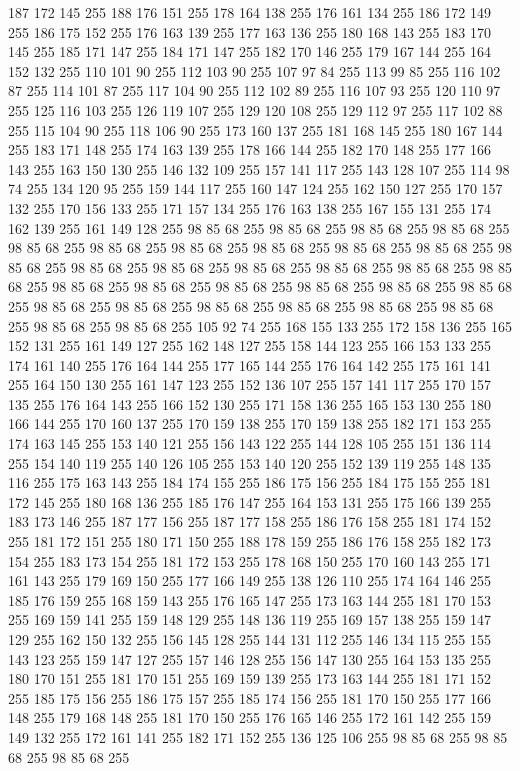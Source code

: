 187 172 145 255 188 176 151 255 178 164 138 255 176 161 134 255 186 172 149 255 186 175 152 255 176 163 139 255 177 163 136 255 180 168 143 255 183 170 145 255 185 171 147 255 184 171 147 255 182 170 146 255 179 167 144 255 164 152 132 255 110 101 90 255 112 103 90 255 107 97 84 255 113 99 85 255 116 102 87 255 114 101 87 255 117 104 90 255 112 102 89 255 116 107 93 255 120 110 97 255 125 116 103 255 126 119 107 255 129 120 108 255 129 112 97 255 117 102 88 255 115 104 90 255 118 106 90 255 173 160 137 255 181 168 145 255 180 167 144 255 183 171 148 255 174 163 139 255 178 166 144 255 182 170 148 255 177 166 143 255 163 150 130 255 146 132 109 255 157 141 117 255 143 128 107 255 114 98 74 255 134 120 95 255 159 144 117 255 160 147 124 255 162 150 127 255 170 157 132 255 170 156 133 255 171 157 134 255 176 163 138 255 167 155 131 255 174 162 139 255 161 149 128 255 98 85 68 255 98 85 68 255 98 85 68 255 98 85 68 255 98 85 68 255 98 85 68 255 98 85 68 255 98 85 68 255
98 85 68 255 98 85 68 255 98 85 68 255 98 85 68 255 98 85 68 255 98 85 68 255 98 85 68 255 98 85 68 255 98 85 68 255 98 85 68 255 98 85 68 255 98 85 68 255 98 85 68 255 98 85 68 255 98 85 68 255 98 85 68 255 98 85 68 255 98 85 68 255 98 85 68 255 98 85 68 255 98 85 68 255 98 85 68 255 98 85 68 255 105 92 74 255 168 155 133 255 172 158 136 255 165 152 131 255 161 149 127 255 162 148 127 255 158 144 123 255 166 153 133 255 174 161 140 255 176 164 144 255 177 165 144 255 176 164 142 255 175 161 141 255 164 150 130 255 161 147 123 255 152 136 107 255 157 141 117 255 170 157 135 255 176 164 143 255 166 152 130 255 171 158 136 255 165 153 130 255 180 166 144 255 170 160 137 255 170 159 138 255 170 159 138 255 182 171 153 255 174 163 145 255 153 140 121 255 156 143 122 255 144 128 105 255 151 136 114 255 154 140 119 255 140 126 105 255 153 140 120 255 152 139 119 255 148 135 116 255 175 163 143 255 184 174 155 255 186 175 156 255 184 175 155 255
181 172 145 255 180 168 136 255 185 176 147 255 164 153 131 255 175 166 139 255 183 173 146 255 187 177 156 255 187 177 158 255 186 176 158 255 181 174 152 255 181 172 151 255 180 171 150 255 188 178 159 255 186 176 158 255 182 173 154 255 183 173 154 255 181 172 153 255 178 168 150 255 170 160 143 255 171 161 143 255 179 169 150 255 177 166 149 255 138 126 110 255 174 164 146 255 185 176 159 255 168 159 143 255 176 165 147 255 173 163 144 255 181 170 153 255 169 159 141 255 159 148 129 255 148 136 119 255 169 157 138 255 159 147 129 255 162 150 132 255 156 145 128 255 144 131 112 255 146 134 115 255 155 143 123 255 159 147 127 255 157 146 128 255 156 147 130 255 164 153 135 255 180 170 151 255 181 170 151 255 169 159 139 255 173 163 144 255 181 171 152 255 185 175 156 255 186 175 157 255 185 174 156 255 181 170 150 255 177 166 148 255 179 168 148 255 181 170 150 255 176 165 146 255 172 161 142 255 159 149 132 255 172 161 141 255 182 171 152 255 136 125 106 255 98 85 68 255 98 85 68 255 98 85 68 255
